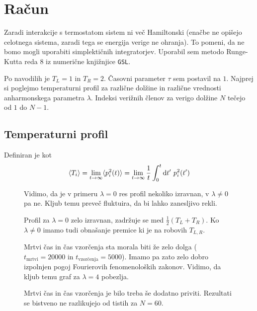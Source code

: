 \documentclass[a4 paper, 12pt]{article}
\begin{document}
\section{Ra\v cun}

Zaradi interakcije s termostatom sistem ni več Hamiltonski (enačbe ne opišejo celotnega sistema, zaradi tega se energija verige ne
ohranja). To pomeni, da ne bomo mogli uporabiti simplektičnih integratorjev. Uporabil sem metodo Runge-Kutta reda 8 iz numerične
knjižnjice {\tt GSL}.

Po navodilih je $T_L = 1$ in $T_R = 2$. Časovni parameter $\tau$ sem postavil na $1$. Najprej si poglejmo temperaturni profil za
razli\v cne dol\v zine in razli\v cne vrednosti anharmonskega parametra $\lambda$. Indeksi verižnih členov za verigo dolžine $N$ tečejo
od $1$ do $N - 1$.

\subsection{Temperaturni profil}

Definiran je kot
\[
	\langle T_i \rangle = \lim_{t \to \infty} \langle p_i^2 (t) \rangle = \lim_{t \to \infty} \frac{1}{t} \int_0^{t} \text{d} t'\ p_i^2 (t')
\]

\begin{figure}[H]
	
	\caption{Vidimo, da je v primeru $\lambda = 0$ res profil nekoliko izravnan, v $\lambda \neq 0$ pa ne. Kljub temu preveč
		fluktuira, da bi lahko zanesljivo rekli.}
\end{figure}

\begin{figure}[H]
	
	\caption{Profil za $\lambda = 0$ zelo izravnan, zadržuje se med $\frac{1}{2}(T_L + T_R)$. Ko $\lambda \neq 0$ imamo tudi
		obnašanje premice ki je na robovih $T_{L,R}$.}
\end{figure}

\begin{figure}[H]
	
	\caption{Mrtvi čas in čas vzorčenja sta morala biti že zelo dolga ($t_\text{mrtvi} = 20000$ in $t_\text{vzorčenja} = 5000$).
		Imamo pa zato zelo dobro izpolnjen pogoj Fourierovih fenomenoloških zakonov. Vidimo, da kljub temu graf za $\lambda = 4$
		pobezlja.}
\end{figure}

\begin{figure}[H]
	
	\caption{Mrtvi čas in čas vzorčenja je bilo treba še dodatno priviti. Rezultati se bistveno ne razlikujejo od tistih za $N = 60$.}
\end{figure}
\end{document}

